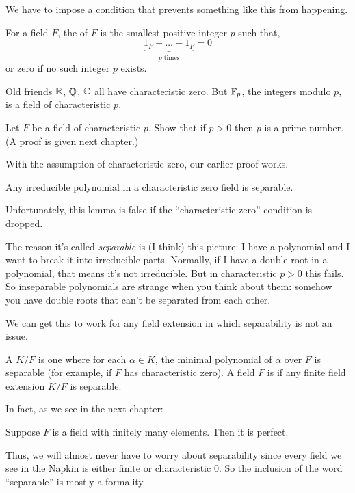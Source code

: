 We have to impose a condition that prevents something like this from happening.
\begin{definition}
	For a field $F$, the  of $F$ is the smallest
	positive integer $p$ such that,
	\[ \underbrace{1_F + \dots + 1_F}_{\text{$p$ times}} = 0 \]
	or zero if no such integer $p$ exists.
\end{definition}
\begin{example}
	Old friends $\mathbb R$, $\mathbb Q$, $\mathbb C$ all have characteristic zero.
	But $\mathbb F_p$, the integers modulo $p$, is a field of characteristic $p$.
\end{example}
\begin{exercise}
	Let $F$ be a field of characteristic $p$.
	Show that if $p > 0$ then $p$ is a prime number.
	(A proof is given next chapter.)
\end{exercise}
With the assumption of characteristic zero, our earlier proof works.
\begin{lemma}
	Any irreducible polynomial in a characteristic zero field is separable.
\end{lemma}
Unfortunately, this lemma is false if the ``characteristic zero'' condition is dropped.

\begin{remark}
	The reason it's called \emph{separable} is (I think) this picture:
	I have a polynomial and I want to break it into irreducible parts.
	Normally, if I have a double root in a polynomial, that means it's not irreducible.
	But in characteristic $p > 0$ this fails.
	So inseparable polynomials are strange when you think about them: somehow
	you have double roots that can't be separated from each other.
\end{remark}

We can get this to work for any field extension in which separability is not an issue.
\begin{definition}
	A  $K/F$ is one where for each $\alpha \in K$,
	the minimal polynomial of $\alpha$ over $F$ is separable
	(for example, if $F$ has characteristic zero).
	A field $F$ is  if any finite field extension $K/F$ is separable.
\end{definition}
In fact, as we see in the next chapter:
\begin{theorem}
	Suppose $F$ is a field with finitely many elements. Then it is perfect.
\end{theorem}
Thus, we will almost never have to worry about separability
since every field we see in the Napkin is either finite or characteristic $0$.
So the inclusion of the word ``separable'' is mostly a formality.

